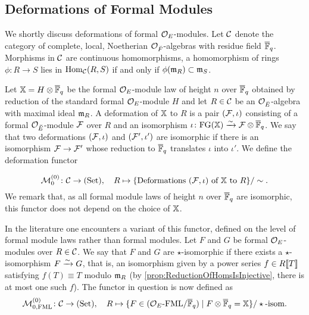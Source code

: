 \documentclass[../main.tex]{subfiles}
\begin{document}
\subsection{Deformations of Formal Modules} %
\label{sub:Deformations of Formal Modules}
We shortly discuss deformations of formal $\mathcal{O}_E$-modules.
Let $\mathcal{C}$ denote the category of complete, local, Noetherian
$\mathcal{O}_{\breve {F}}$-algebras with residue field $\overline {\mathbb{F}}_q$. Morphisms in $\mathcal{C}$ are continuous
homomorphisms, a homomorphism of rings $\phi: R \to S$ lies in 
$\operatorname{Hom}_{\mathcal{C}}(R,S)$ if and only if $\phi(\mathfrak{m}_R) \subset \mathfrak{m}_S$.

Let $\mathbb{X} = H \otimes {\overline{\mathbb{F}}_q}$ be the formal $\mathcal{O}_E$-module law of height $n$
over ${\overline {\mathbb{F}}_q}$ obtained by reduction of the standard formal $\mathcal{O}_E$-module $H$
and let $R \in \mathcal{C}$ be an $\mathcal{O}_{\breve {E}}$-algebra with maximal ideal $\mathfrak{m}_R$. A
deformation
of $\mathbb{X}$ to $R$ is a pair $(\mathcal{F}, \iota)$ consisting of a formal $\mathcal{O}_{\breve {E}}$-module $\mathcal{F}$ over $R$ and an isomorphism $\iota\colon \textnormal{FG}(\mathbb{X}) \xrightarrow{\sim}
\mathcal{F} \otimes {\overline{\mathbb{F}}_q}$. We say that two deformations $(\mathcal{F}, \iota)$ and $(\mathcal{F}',
\iota')$ are isomorphic if there is an isomorphism $\mathcal{F} \to \mathcal{F}'$ whose
reduction to ${\overline {\mathbb{F}}_q}$ translates $\iota$ into $\iota'$. We define the 
deformation functor

\begin{equation*}
  \mathcal{M}^{(0)}_0 \colon \mathcal{C} \to {(\mathrm{Set})}, \quad R \mapsto \{\text{Deformations $(\mathcal{F},
  \iota)$ of $\mathbb{X}$ to $R$}\}/\sim.
\end{equation*}
We remark that, as all formal module laws of height $n$ over ${\overline {\mathbb{F}}_q}$ are 
isomorphic, this functor does not depend on the choice of $\mathbb{X}$. 

In the literature one encounters a variant of this functor, defined on the
level of formal
module laws rather than formal modules. Let $F$ and $G$ be formal $\mathcal{O}_E$-modules over
$R \in \mathcal{C}$. We say that $F$ and $G$ are $\star$-isomorphic if there exists a 
$\star$-isomorphism $F \xrightarrow{\sim} G$, that is, an isomorphism given by a power series
$f \in R\llbracket T \rrbracket$ satisfying $f(T) \equiv T$ modulo $\mathfrak{m}_R$ (by
\cref{prop:ReductionOfHomsIsInjective}, there is at most one such $f$).
The functor in question is now defined as 
\begin{equation*}
  \mathcal{M}^{(0)}_{0, \text{FML}} \colon \mathcal{C} \to {(\mathrm{Set})}, \quad R \mapsto \{F \in {({\mathcal{O}_E}\textnormal-\allowbreak\mathrm{FML}/{{\overline{\mathbb{F}}_q}})} \mid
  F \otimes {\overline{\mathbb{F}}_q} = \mathbb{X}\} / \star\text{-isom.}
\end{equation*}
\end{document}

